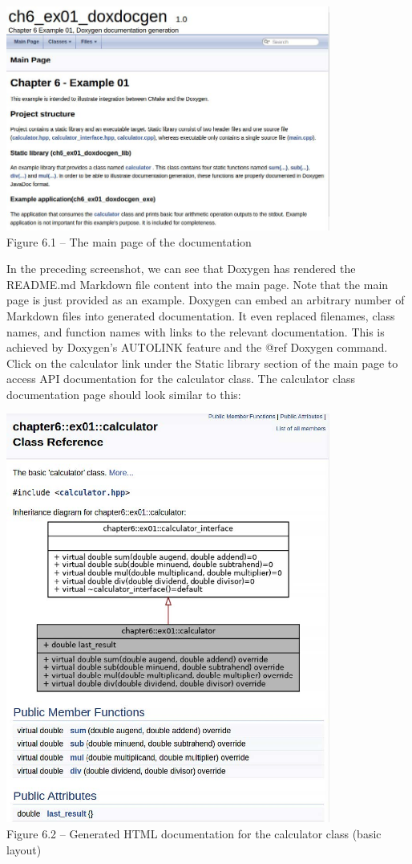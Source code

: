 \begin{center}
\includegraphics[width=0.8\textwidth]{content/2/chapter6/images/1.jpg}\\
Figure 6.1 – The main page of the documentation
\end{center}

In the preceding screenshot, we can see that Doxygen has rendered the README.md Markdown file content into the main page. Note that the main page is just provided as an example. Doxygen can embed an arbitrary number of Markdown files into generated documentation. It even replaced filenames, class names, and function names with links to the relevant documentation. This is achieved by Doxygen's AUTOLINK feature and the @ref Doxygen command. Click on the calculator link under the Static library section of the main page to access API documentation for the calculator class. The calculator class documentation page should look similar to this:

\begin{center}
\includegraphics[width=0.8\textwidth]{content/2/chapter6/images/2.jpg}\\
Figure 6.2 – Generated HTML documentation for the calculator class (basic layout)
\end{center}

